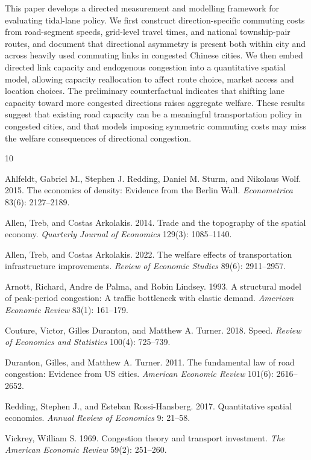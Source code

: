 \documentclass[12pt]{article}
\begin{document}
This paper develops a directed measurement and modelling framework for evaluating tidal-lane policy. We first construct direction-specific commuting costs from road-segment speeds, grid-level travel times, and national township-pair routes, and document that directional asymmetry is present both within city and across heavily used commuting links in congested Chinese cities. We then embed directed link capacity and endogenous congestion into a quantitative spatial model, allowing capacity reallocation to affect route choice, market access and location choices. The preliminary counterfactual indicates that shifting lane capacity toward more congested directions raises aggregate welfare. These results suggest that existing road capacity can be a meaningful transportation policy in congested cities, and that models imposing symmetric commuting costs may miss the welfare consequences of directional congestion.
\begin{thebibliography}{10}

Ahlfeldt, Gabriel M., Stephen J. Redding, Daniel M. Sturm, and Nikolaus Wolf. 2015.
\newblock The economics of density: Evidence from the Berlin Wall.
\newblock \emph{Econometrica} 83(6): 2127--2189.

Allen, Treb, and Costas Arkolakis. 2014.
\newblock Trade and the topography of the spatial economy.
\newblock \emph{Quarterly Journal of Economics} 129(3): 1085--1140.

Allen, Treb, and Costas Arkolakis. 2022.
\newblock The welfare effects of transportation infrastructure improvements.
\newblock \emph{Review of Economic Studies} 89(6): 2911--2957.

Arnott, Richard, Andre de Palma, and Robin Lindsey. 1993.
\newblock A structural model of peak-period congestion: A traffic bottleneck with elastic demand.
\newblock \emph{American Economic Review} 83(1): 161--179.

Couture, Victor, Gilles Duranton, and Matthew A. Turner. 2018.
\newblock Speed.
\newblock \emph{Review of Economics and Statistics} 100(4): 725--739.

Duranton, Gilles, and Matthew A. Turner. 2011.
\newblock The fundamental law of road congestion: Evidence from US cities.
\newblock \emph{American Economic Review} 101(6): 2616--2652.

Redding, Stephen J., and Esteban Rossi-Hansberg. 2017.
\newblock Quantitative spatial economics.
\newblock \emph{Annual Review of Economics} 9: 21--58.

Vickrey, William S. 1969.
\newblock Congestion theory and transport investment.
\newblock \emph{The American Economic Review} 59(2): 251--260.

\end{thebibliography}
\end{document}
